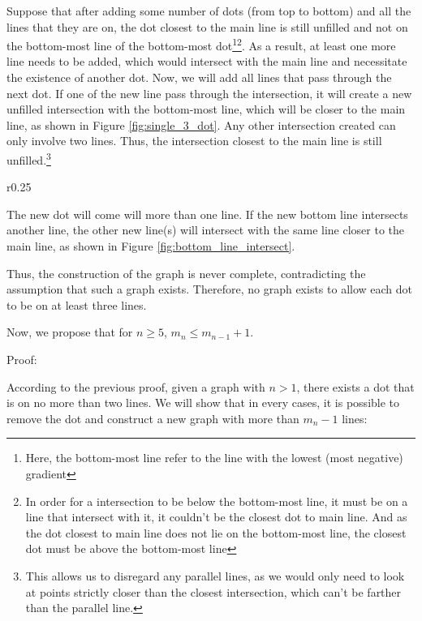 \documentclass[a4paper, 12pt]{article}
\begin{document}
Suppose that after adding some number of dots (from top to bottom) and all the lines that they are on, the dot closest to the main line is still unfilled and not on the bottom-most line of the bottom-most dot\footnote{Here, the bottom-most line refer to the line with the lowest (most negative) gradient}\footnote{In order for a intersection to be below the bottom-most line, it must be on a line that intersect with it, it couldn't be the closest dot to main line. And as the dot closest to main line does not lie on the bottom-most line, the closest dot must be above the bottom-most line}. As a result, at least one more line needs to be added, which would intersect with the main line and necessitate the existence of another dot. Now, we will add all lines that pass through the next dot. If one of the new line pass through the intersection, it will create a new unfilled intersection with the bottom-most line, which will be closer to the main line, as shown in Figure \ref{fig:single_3_dot}. Any other intersection created can only involve two lines. Thus, the intersection closest to the main line is still unfilled.\footnote{This allows us to disregard any parallel lines, as we would only need to look at points strictly closer than the closest intersection, which can't be farther than the parallel line.\label{footnote_para_1}}

\begin{wrapfigure}{r}{0.25\textwidth}
    \vspace{-1\baselineskip}
    
    \caption{If the bottom line intersect with another line.}
    \label{fig:bottom_line_intersect}
\end{wrapfigure}
The new dot will come will more than one line. If the new bottom line intersects another line, the other new line(s) will intersect with the same line closer to the main line, as shown in Figure \ref{fig:bottom_line_intersect}.

Thus, the construction of the graph is never complete, contradicting the assumption that such a graph exists. Therefore, no graph exists to allow each dot to be on at least three lines.


Now, we propose that for $n\geq5$, $m_n\leq m_{n-1}+1$.

Proof:

According to the previous proof, given a graph with $n>1$, there exists a dot that is on no more than two lines. We will show that in every cases, it is possible to remove the dot and construct a new graph with more than $m_{n}-1$ lines:
\end{document}
